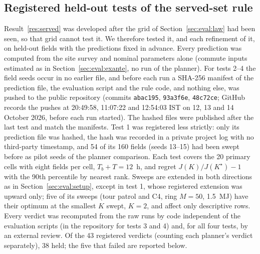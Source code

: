 \documentclass[journal,outdir=./]{IEEEtran}
\begin{document}
\subsection{Registered held-out tests of the served-set rule}\label{sec:eval:heldout}
Result~\ref{res:served} was developed after the grid of Section~\ref{sec:eval:law} had been seen, so that grid cannot test it. We therefore tested it, and each refinement of it, on held-out fields with the predictions fixed in advance. Every prediction was computed from the site survey and nominal parameters alone (commute inputs estimated as in Section~\ref{sec:eval:exante}, no run of the planner). For tests 2--4 the field seeds occur in no earlier file, and before each run a SHA-256 manifest of the prediction file, the evaluation script and the rule code, and nothing else, was pushed to the public repository (commits \texttt{abac195}, \texttt{93a3f6e}, \texttt{48c72ce}; GitHub records the pushes at 20:49:58, 11:07:22 and 12:54:03 IST on 12, 13 and 14 October 2026, before each run started). The hashed files were published after the last test and match the manifests. Test 1 was registered less strictly: only its prediction file was hashed, the hash was recorded in a private project log with no third-party timestamp, and 54 of its 160 fields (seeds 13--15) had been swept before as pilot seeds of the planner comparison. Each test covers the 20 primary cells with eight fields per cell, $T_b+T=12$~h, and regret $J(K)/J(K^{\star})-1$ with the 90th percentile by nearest rank. Sweeps are extended in both directions as in Section~\ref{sec:eval:setup}, except in test 1, whose registered extension was upward only; five of its sweeps (tour patrol and C4, ring $M=50$, 1.5~MJ) have their optimum at the smallest $K$ swept, $K=2$, and affect only descriptive rows. Every verdict was recomputed from the raw runs by code independent of the evaluation scripts (in the repository for tests 3 and 4) and, for all four tests, by an external review. Of the 43 registered verdicts (counting each planner's verdict separately), 38 held; the five that failed are reported below.
\end{document}
